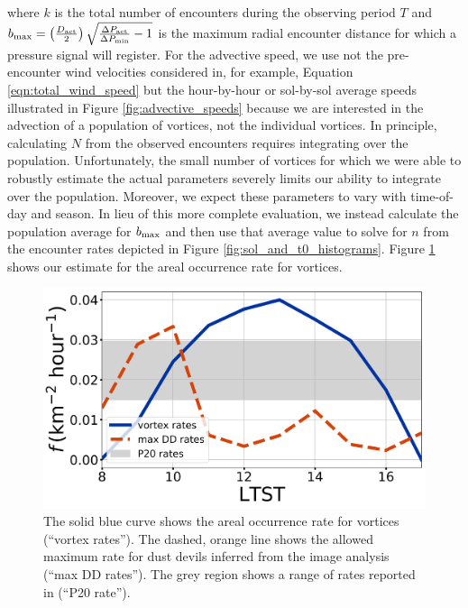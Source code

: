 \documentclass{aastex63}
\begin{document}
where $k$ is the total number of encounters during the observing period $T$ and $b_{\rm max} = \left( \frac{D_{\rm act}}{2} \right) \sqrt{ \frac{\Delta P_{\rm act}}{\Delta P_{\rm min}} - 1 }$ is the maximum radial encounter distance for which a pressure signal will register. For the advective speed, we use not the pre-encounter wind velocities considered in, for example, Equation \ref{eqn:total_wind_speed} but the hour-by-hour or sol-by-sol average speeds illustrated in Figure \ref{fig:advective_speeds} because we are interested in the advection of a population of vortices, not the individual vortices. In principle, calculating $N$ from the observed encounters requires integrating over the population. Unfortunately, the small number of vortices for which we were able to robustly estimate the actual parameters severely limits our ability to integrate over the population.  Moreover, we expect these parameters to vary with time-of-day and season. In lieu of this more complete evaluation, we instead calculate the population average for $b_{\rm max}$ and then use that average value to solve for $n$ from the encounter rates depicted in Figure \ref{fig:sol_and_t0_histograms}. Figure \ref{fig:areal_occurrence_rate} shows our estimate for the areal occurrence rate for vortices.

\begin{figure}
    \centering
    \includegraphics[width=\textwidth]{figures/areal_occurrence_rate.png}
    \caption{The solid blue curve shows the areal occurrence rate for vortices (``vortex rates''). The dashed, orange line shows the allowed maximum rate for dust devils inferred from the image analysis (``max DD rates''). The grey region shows a range of rates reported in \citet{2020GeoRL..4787234P} (``P20 rate'').}
    \label{fig:areal_occurrence_rate}
\end{figure}
\end{document}

